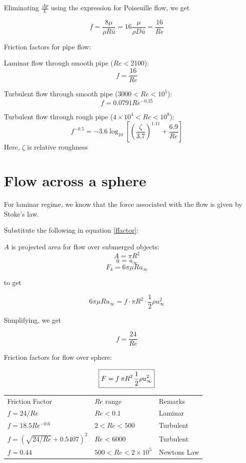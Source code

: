 Eliminating $\frac{\Delta p}{L}$ using the expression for Poiseuille flow, we get 

$$ f = \frac{8 \mu}{\rho R \bar{u}} = 16 \frac{\mu}{\rho D \bar{u}} = \frac{16}{Re}  $$

Friction factors for pipe flow:

Laminar flow through smooth pipe ($Re < 2100$): $$f = \frac{16}{Re}$$ 

Turbulent flow through smooth pipe ($ 3000 < Re < 10^5$): $$f = 0.0791 Re^{-0.25}$$ 

Turbulent flow through rough pipe ($4 \times 10^4 < Re < 10^8$): 
$$f^{-0.5} = -3.6 \log_{10}\left[ \left(\frac{\zeta}{3.7}\right)^{1.11} + \frac{6.9}{Re} \right]$$
Here, $\zeta$ is relative roughness


\section{Flow across a sphere}

For laminar regime, we know that the force associated with the flow is given by Stoke's law.


Substitute the following in equation \ref{ffactor}:

$A$ is projected area for flow over submerged objects:
$$ A = \pi R^2 $$
$$ \bar{u} = u_\infty$$
$$ F_k = 6 \pi \mu R u_\infty $$

to get

$$ 6 \pi \mu R u_\infty = f \cdot \pi R^2 \cdot \frac{1}{2} \rho u_\infty^2 $$

Simplifying, we get 

$$ f = \frac{24}{Re} $$

Friction factors for flow over sphere:

\begin{equation}
 \boxed{
 F = f \, \pi R^2 \, {1\over 2} \rho u_\infty^2
 }
\end{equation}


\begin{tabular}{lll}
Friction Factor & $Re$ range & Remarks \\
 $f = {24 / Re}$ & $Re < 0.1$ & Laminar \\
 $f = 18.5 Re^{-0.6}$ & $ 2 < Re < 500$ & Turbulent \\
 $f = \left( \sqrt{24 / Re} + 0.5407 \right)^2$ & $Re<6000$ & Turbulent \\
 $f = 0.44$ & $ 500 < Re < 2 \times 10^5$ & Newtons Law
\end{tabular}


